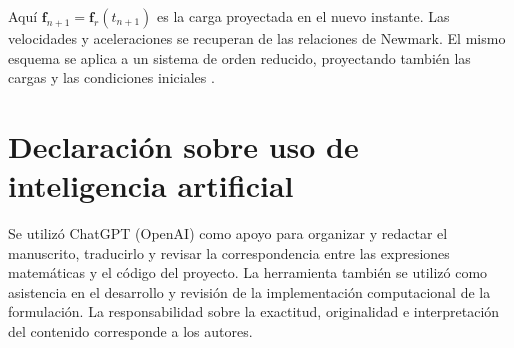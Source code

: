 Aquí $\bm f_{n+1}=\bm f_r(t_{n+1})$ es la carga proyectada en el nuevo instante. Las velocidades y aceleraciones se recuperan de las relaciones de Newmark. El mismo esquema se aplica a un sistema de orden reducido, proyectando también las cargas y las condiciones iniciales \citep{newmark1971}.

\section{Declaración sobre uso de inteligencia artificial}
Se utilizó ChatGPT (OpenAI) como apoyo para organizar y redactar el manuscrito, traducirlo y revisar la correspondencia entre las expresiones matemáticas y el código del proyecto. La herramienta también se utilizó como asistencia en el desarrollo y revisión de la implementación computacional de la formulación. La responsabilidad sobre la exactitud, originalidad e interpretación del contenido corresponde a los autores.
